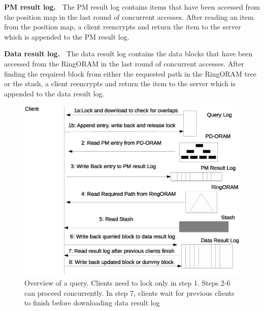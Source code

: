 {\bf PM result log.~}
%
The PM result log contains items that have been accessed from the position map 
in the last round of concurrent accesses. After reading an item from the 
position map, a client reencrypts and return the item to the server which is appended to the PM 
result log. 

{\bf Data result log.~}
%
The data result log contains the data blocks that have been accessed from the 
RingORAM in the last round of concurrent accesses. After finding the required block from either 
the requested path in the RingORAM tree or the stash, 
a client reencrypts and return the item to the server which is appended to the data 
result log.


\begin{figure}
 \includegraphics[scale=0.30]{Figures/Query_overview.eps}
 \caption{Overview of a query. Clients need to lock only in step 1. Steps 2-6 can proceed concurrently. In step 7, clients wait for previous clients to finish before downloading
 data result log \label{query_overview}}
\end{figure}


